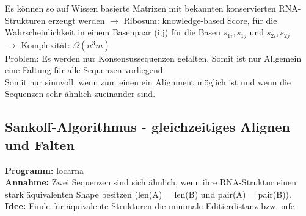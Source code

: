 Es können so auf Wissen basierte Matrizen mit bekannten konservierten RNA-Strukturen erzeugt werden
$\rightarrow$ Ribosum: knowledge-based Score, für die Wahrscheinlichkeit in einem Basenpaar (i,j) für die Basen $s_{1i}, s_{1j}$ und $s_{2i}, s_{2j}$ \\

$\rightarrow$ Komplexität: $\Omega(n^{3}m)$ \\

Problem: Es werden nur Konsensussequenzen gefalten. Somit ist nur Allgemein eine Faltung für alle Sequenzen vorliegend. \\
Somit nur sinnvoll, wenn zum einen ein Alignment möglich ist und wenn die Sequenzen sehr ähnlich zueinander sind.

\subsection{Sankoff-Algorithmus - gleichzeitiges Alignen und Falten}

\textbf{Programm:} locarna \\

\textbf{Annahme:} Zwei Sequenzen sind sich ähnlich, wenn ihre RNA-Struktur einen stark äquivalenten Shape besitzen (len(A) = len(B) und pair(A) = pair(B)).\\

\textbf{Idee:} Finde für äquivalente Strukturen die minimale Editierdistanz  bzw. mfe \\

